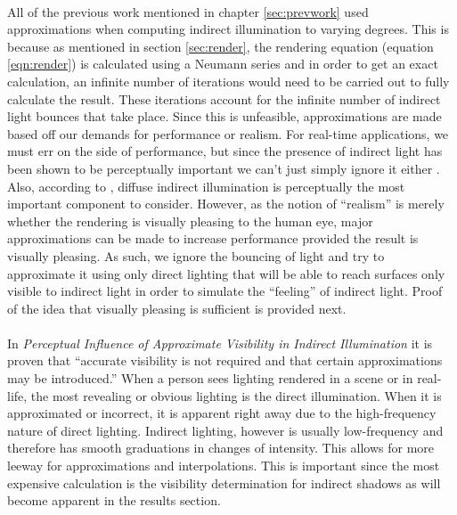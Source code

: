 \paragraph{}
All of the previous work mentioned in chapter \ref{sec:prevwork} used approximations when computing indirect illumination to varying degrees.  This is because as mentioned in section \ref{sec:render}, the rendering equation (equation \ref{eqn:render}) is calculated using a Neumann series and in order to get an exact calculation, an infinite number of iterations would need to be carried out to fully calculate the result.  These iterations account for the infinite number of indirect light bounces that take place.  Since this is unfeasible, approximations are made based off our demands for performance or realism.  For real-time applications, we must err on the side of performance, but since the presence of indirect light has been shown to be perceptually important we can't just simply ignore it either \cite{Stokes2004}.  Also, according to \cite{Stokes2004}, diffuse indirect illumination is perceptually the most important component to consider.  However, as the notion of ``realism'' is merely whether the rendering is visually pleasing to the human eye, major approximations can be made to increase performance provided the result is visually pleasing.  As such, we ignore the bouncing of light and try to approximate it using only direct lighting that will be able to reach surfaces only visible to indirect light in order to simulate the ``feeling'' of indirect light.  Proof of the idea that visually pleasing is sufficient is provided next.

\paragraph{}
In \textit{Perceptual Influence of Approximate Visibility in Indirect Illumination} \cite{Yu2009} it is proven that ``accurate visibility is not required and that certain approximations may be introduced.''  When a person sees lighting rendered in a scene or in real-life, the most revealing or obvious lighting is the direct illumination.  When it is approximated or incorrect, it is apparent right away due to the high-frequency nature of direct lighting.  Indirect lighting, however is usually low-frequency and therefore has smooth graduations in changes of intensity.  This allows for more leeway for approximations and interpolations.  This is important since the most expensive calculation is the visibility determination for indirect shadows as will become apparent in the results section.  

